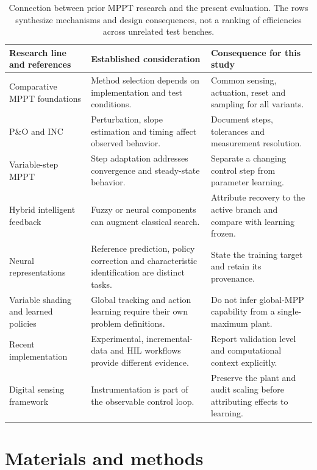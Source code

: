 \documentclass[Acad.Energy.,researcharticle,9pt,twoside,oneauthor]{Definitions/jams_academia}
\begin{document}
\begin{table}[htbp]
\caption{Connection between prior MPPT research and the present evaluation. The rows synthesize mechanisms and design consequences, not a ranking of efficiencies across unrelated test benches.}
\label{tab:literature}
\centering\small
\begin{tabularx}{\textwidth}{p{}LL}\toprule
Research line and references & Established consideration & Consequence for this study\\\midrule
Comparative MPPT foundations \cite{esram,subudhi,hohm} & Method selection depends on implementation and test conditions. & Common sensing, actuation, reset and sampling for all variants.\\
P\&O and INC \cite{femia,hussein,sera} & Perturbation, slope estimation and timing affect observed behavior. & Document steps, tolerances and measurement resolution.\\
Variable-step MPPT \cite{liu,adaptive,adaptive2015} & Step adaptation addresses convergence and steady-state behavior. & Separate a changing control step from parameter learning.\\
Hybrid intelligent feedback \cite{zainuri,hybrid2024} & Fuzzy or neural components can augment classical search. & Attribute recovery to the active branch and compare with learning frozen.\\
Neural representations \cite{hiyama,elobaid,nnmodel} & Reference prediction, policy correction and characteristic identification are distinct tasks. & State the training target and retain its provenance.\\
Variable shading and learned policies \cite{rizzo,giraldo} & Global tracking and action learning require their own problem definitions. & Do not infer global-MPP capability from a single-maximum plant.\\
Recent implementation \cite{abouzeid,amine,jamshed} & Experimental, incremental-data and HIL workflows provide different evidence. & Report validation level and computational context explicitly.\\
Digital sensing framework \cite{suarez} & Instrumentation is part of the observable control loop. & Preserve the plant and audit scaling before attributing effects to learning.\\\bottomrule
\end{tabularx}
\end{table}



\section{Materials and methods}
\end{document}
